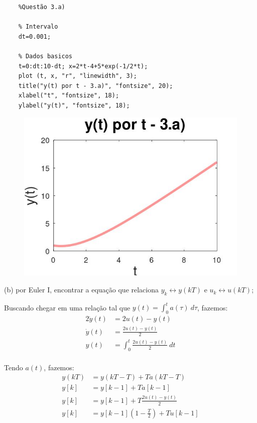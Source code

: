 \documentclass[10pt]{article}
\begin{document}
\begin{verbatim}
    %Questão 3.a)

    % Intervalo
    dt=0.001;

    % Dados basicos
    t=0:dt:10-dt; x=2*t-4+5*exp(-1/2*t);
    plot (t, x, "r", "linewidth", 3);
    title("y(t) por t - 3.a)", "fontsize", 20);
    xlabel("t", "fontsize", 18);
    ylabel("y(t)", "fontsize", 18);
\end{verbatim}

\begin{figure}[h]
    \includegraphics[scale=0.3]{questao3a.jpg}
    \centering
\end{figure}

(b) por Euler I, encontrar a equação que relaciona $y_k \leftrightarrow y(kT)$ e $u_k \leftrightarrow u(kT)$;

Buscando chegar em uma relação tal que $y(t) = \int_{0}^{t} a(\tau) \ d\tau$, fazemos:
\begin{align*}
    2 \dot{y}(t) &= 2u(t) - y(t)\\
    \dot{y}(t) &= \frac{2u(t) - y(t)}{2}\\
    y(t) &= \int_{0}^{t} \frac{2u(t) - y(t)}{2} \ dt\\
\end{align*}

Tendo $a(t)$, fazemos:
\begin{align*}
    y(kT) &= y(kT -T) + Ta(kT - T)\\
    y[k] &= y[k - 1] + Ta[k - 1]\\
    y[k] &= y[k - 1] + T \frac{2u(t) - y(t)}{2}\\
    y[k] &= y[k - 1] \left(1 - \frac{T}{2}\right) + Tu[k - 1]
\end{align*}
\end{document}
